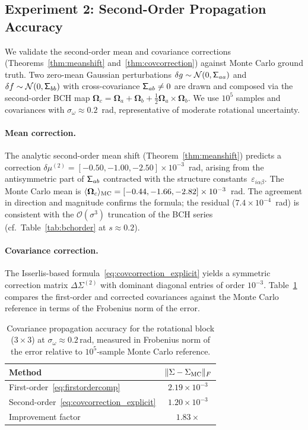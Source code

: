 \documentclass[journal]{IEEEtran}
\newcommand{\bfOmega}{\boldsymbol{\Omega}}
\newcommand{\sfSigma}[1]{\mathsf{\Sigma}_\mathnormal{#1}}
\begin{document}
\subsection{Experiment 2: Second-Order Propagation Accuracy}
 
We validate the second-order mean and covariance corrections
(Theorems~\ref{thm:meanshift} and~\ref{thm:covcorrection})
against Monte Carlo ground truth.
Two zero-mean Gaussian perturbations
$\delta g \sim \mathcal{N}(0, \sfSigma{aa})$ and
$\delta f \sim \mathcal{N}(0, \sfSigma{bb})$
with cross-covariance $\sfSigma{ab} \neq 0$ are drawn
and composed via the second-order BCH map
$\bfOmega_c = \bfOmega_a + \bfOmega_b
+ \tfrac{1}{2}\bfOmega_a \times \bfOmega_b$.
We use $10^5$ samples and covariances with
$\sigma_\omega \approx 0.2$~rad, representative of
moderate rotational uncertainty.
 
\paragraph{Mean correction.}
The analytic second-order mean shift (Theorem~\ref{thm:meanshift})
predicts a correction
$\delta\mu^{(2)} = [-0.50, -1.00, -2.50] \times 10^{-3}$~rad,
arising from the antisymmetric part of $\sfSigma{ab}$
contracted with the structure constants~$\varepsilon_{i\alpha\beta}$.
The Monte Carlo mean is
$\langle \bfOmega_c \rangle_{\rm MC}
= [-0.44, -1.66, -2.82] \times 10^{-3}$~rad.
The agreement in direction and magnitude confirms
the formula; the residual ($7.4\times 10^{-4}$~rad)
is consistent with the $\mathcal{O}(\sigma^3)$ truncation
of the BCH series (cf.\ Table~\ref{tab:bchorder}
at $s \approx 0.2$).
 
\paragraph{Covariance correction.}
The Isserlis-based formula~\eqref{eq:covcorrection_explicit}
yields a symmetric correction matrix
$\Delta\Sigma^{(2)}$ with dominant diagonal entries
of order $10^{-3}$.
Table~\ref{tab:covmc} compares the first-order and
corrected covariances against the Monte Carlo reference
in terms of the Frobenius norm of the error.
 
\begin{table}[t]
\centering
\caption{Covariance propagation accuracy for the rotational
block ($3\times 3$) at $\sigma_\omega \approx 0.2$\,rad,
measured in Frobenius norm of the error relative to
$10^5$-sample Monte Carlo reference.}
\label{tab:covmc}
\begin{tabular}{l|c}
Method & $\|\Sigma - \Sigma_{\rm MC}\|_F$ \\
\hline
First-order~\eqref{eq:firstordercomp} & $2.19 \times 10^{-3}$ \\
Second-order~\eqref{eq:covcorrection_explicit} & $1.20 \times 10^{-3}$ \\
\hline
Improvement factor & $1.83\times$
\end{tabular}
\end{table}
 
\end{document}
